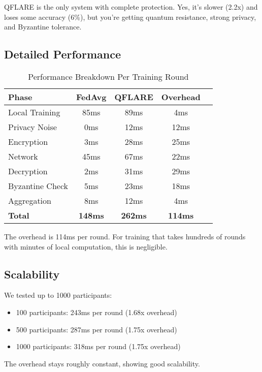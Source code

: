 \documentclass[journal,onecolumn]{IEEEtran}
\begin{document}
QFLARE is the only system with complete protection. Yes, it's slower (2.2x) and loses some accuracy (6\%), but you're getting quantum resistance, strong privacy, and Byzantine tolerance.

\subsection{Detailed Performance}

\begin{table}[htbp]
\centering
\caption{Performance Breakdown Per Training Round}
\label{tab:performance_breakdown}
\begin{tabular}{@{}lcccc@{}}
\toprule
\textbf{Phase} & \textbf{FedAvg} & \textbf{QFLARE} & \textbf{Overhead} \\
\midrule
Local Training & 85ms & 89ms & 4ms \\
Privacy Noise & 0ms & 12ms & 12ms \\
Encryption & 3ms & 28ms & 25ms \\
Network & 45ms & 67ms & 22ms \\
Decryption & 2ms & 31ms & 29ms \\
Byzantine Check & 5ms & 23ms & 18ms \\
Aggregation & 8ms & 12ms & 4ms \\
\midrule
\textbf{Total} & \textbf{148ms} & \textbf{262ms} & \textbf{114ms} \\
\bottomrule
\end{tabular}
\end{table}

The overhead is 114ms per round. For training that takes hundreds of rounds with minutes of local computation, this is negligible.

\subsection{Scalability}

We tested up to 1000 participants:
\begin{itemize}
\item 100 participants: 243ms per round (1.68x overhead)
\item 500 participants: 287ms per round (1.75x overhead)
\item 1000 participants: 318ms per round (1.75x overhead)
\end{itemize}

The overhead stays roughly constant, showing good scalability.
\end{document}
